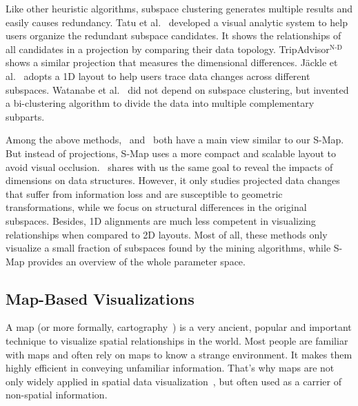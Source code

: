 Like other heuristic algorithms, subspace clustering generates multiple results and easily causes redundancy. Tatu et al.~\cite{DBLP:conf/ieeevast/TatuMFBSSK12} developed a visual analytic system to help users organize the redundant subspace candidates. It shows the relationships of all candidates in a projection by comparing their data topology. TripAdvisor\({}^{\mbox{N-D}}\)~\cite{DBLP:journals/tvcg/NamM13} shows a similar projection that measures the dimensional differences. Jäckle et al.~\cite{jackle2017pattern} adopts a 1D layout to help users trace data changes across different subspaces. Watanabe et al.~\cite{DBLP:conf/apvis/WatanabeWNTF15} did not depend on subspace clustering, but invented a bi-clustering algorithm to divide the data into multiple complementary subparts.

Among the above methods,~\cite{DBLP:conf/ieeevast/TatuMFBSSK12} and~\cite{DBLP:journals/tvcg/NamM13} both have a main view similar to our S-Map. But instead of projections, S-Map uses a more compact and scalable layout to avoid visual occlusion.~\cite{jackle2017pattern} shares with us the same goal to reveal the impacts of dimensions on data structures. However, it only studies projected data changes that suffer from information loss and are susceptible to geometric transformations, while we focus on structural differences in the original subspaces. Besides, 1D alignments are much less competent in visualizing relationships when compared to 2D layouts. Most of all, these methods only visualize a small fraction of subspaces found by the mining algorithms, while S-Map provides an overview of the whole parameter space.

\subsection{Map-Based Visualizations}

A map (or more formally, cartography~\cite{kraak2013cartography}) is a very ancient, popular and important technique to visualize spatial relationships in the world. Most people are familiar with maps and often rely on maps to know a strange environment. It makes them highly efficient in conveying unfamiliar information. That's why maps are not only widely applied in spatial data visualization~\cite{DBLP:journals/ivs/AndrienkoADFW08}, but often used as a carrier of non-spatial information.

